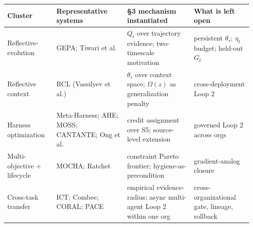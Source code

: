 \documentclass[
]{article}
\newcounter{none} %
\begin{document}
{\def\LTcaptype{none} %
\begin{longtable}[]{@{}
  >{\raggedright\arraybackslash}p{}
  >{\raggedright\arraybackslash}p{}
  >{\raggedright\arraybackslash}p{}
  >{\raggedright\arraybackslash}p{}@{}}
\toprule\noalign{}
\begin{minipage}[b]{\linewidth}\raggedright
Cluster
\end{minipage} & \begin{minipage}[b]{\linewidth}\raggedright
Representative systems
\end{minipage} & \begin{minipage}[b]{\linewidth}\raggedright
§3 mechanism instantiated
\end{minipage} & \begin{minipage}[b]{\linewidth}\raggedright
What is left open
\end{minipage} \\
\midrule\noalign{}
\endhead
\bottomrule\noalign{}
\endlastfoot
Reflective-evolution & GEPA; Tiwari et al. & \(Q_t\) over trajectory
evidence; two-timescale motivation & persistent \(\theta_s\); \(\eta_t\)
budget; held-out \(G_t\) \\
Reflective context & RCL (Vassilyev et al.) & \(\theta_s\) over context
space; \(\Omega(z)\) as generalization penalty & cross-deployment Loop
2 \\
Harness optimization & Meta-Harness; AHE; MOSS; CANTANTE; Ong et al. &
credit assignment over S5; source-level extension & governed Loop 2
across orgs \\
Multi-objective + lifecycle & MOCHA; Ratchet & constraint Pareto
frontier; hygiene-as-precondition & gradient-analog closure \\
Cross-task transfer & ICT; Combee; CORAL; PACE & empirical
evidence-radius; async multi-agent Loop 2 within one org &
cross-organizational gate, lineage, rollback \\
\end{longtable}
}
\end{document}
